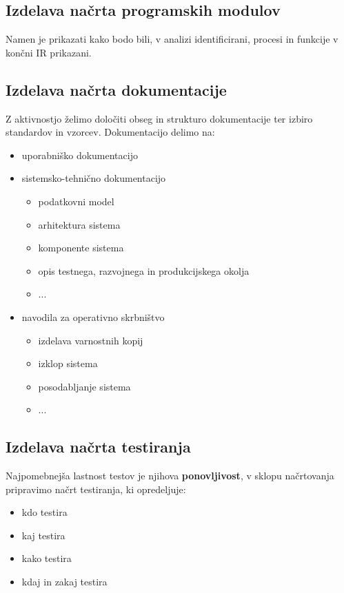 \documentclass[a4paper,12pt]{report}
\begin{document}
   \subsection{Izdelava načrta programskih modulov}
   Namen je prikazati kako bodo bili, v analizi identificirani, procesi in funkcije v končni IR prikazani.

   \subsection{Izdelava načrta dokumentacije}
   Z aktivnostjo želimo določiti obseg in strukturo dokumentacije ter izbiro standardov in vzorcev. Dokumentacijo delimo na:
   \begin{itemize}
      \item uporabniško dokumentacijo
      \item sistemsko-tehnično dokumentacijo
      \begin{itemize}
         \item podatkovni model
         \item arhitektura sistema
         \item komponente sistema
         \item opis testnega, razvojnega in produkcijskega okolja
         \item ...
      \end{itemize}
      \item navodila za operativno skrbništvo
      \begin{itemize}
         \item izdelava varnostnih kopij
         \item izklop sistema
         \item posodabljanje sistema
         \item ...
      \end{itemize}
   \end{itemize}

   \subsection{Izdelava načrta testiranja}
   Najpomebnejša lastnost testov je njihova \textbf{ponovljivost}, v sklopu načrtovanja pripravimo načrt testiranja, ki opredeljuje:
   \begin{itemize}
      \item kdo testira
      \item kaj testira
      \item kako testira
      \item kdaj in zakaj testira
   \end{itemize}
\end{document}

